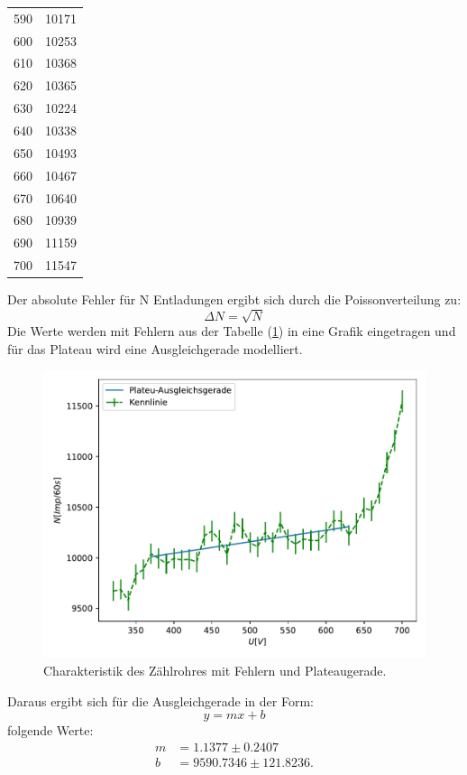\begin{table}
\begin{tabular}{c c}
            590 & 	10171 \\
            600 & 	10253 \\
            610 & 	10368 \\
            620 & 	10365 \\
            630 & 	10224 \\
            640 & 	10338 \\
            650 & 	10493 \\
            660 & 	10467 \\
            670 & 	10640 \\
            680 & 	10939 \\
            690 & 	11159 \\
            700 & 	11547 \\
            \bottomrule 
        \end{tabular}
    \label{tab:a}
    \end{table}
    \newpage
\noindent
    Der absolute Fehler für N Entladungen ergibt sich durch die Poissonverteilung zu:
    \begin{equation}
    \label{eqn:absoluterfehler}
    \Delta N = \sqrt{N}
    \end{equation}
\noindent
    Die Werte werden mit Fehlern aus der Tabelle (\ref{tab:a}) in eine Grafik eingetragen und für das Plateau wird eine Ausgleichgerade modelliert. 
    \begin{figure}
	\centering
	\includegraphics[width=0.8\linewidth]{Daten/a.pdf}
	\caption{Charakteristik des Zählrohres mit Fehlern und Plateaugerade.}
	\label{fig:plateau}
    \end{figure}
\noindent
    Daraus ergibt sich für die Ausgleichgerade in der Form: 
    \begin{equation*}
    \label{eq:ausgleichsgerade}
    y = mx + b
    \end{equation*}
    folgende Werte:
    \begin{align*}
    m &= 1.1377 \pm 0.2407\\
    b &= 9590.7346 \pm 121.8236.
    \end{align*}

